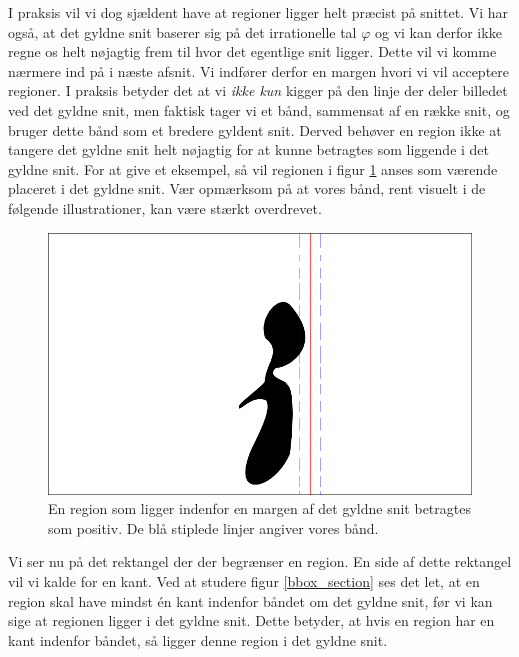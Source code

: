 {I praksis vil vi dog sjældent have at regioner ligger helt præcist på
snittet.
Vi har også, at det gyldne snit baserer sig på det
irrationelle tal $\varphi$ og vi kan derfor ikke regne os helt nøjagtig
frem til hvor det egentlige snit ligger. Dette vil vi komme nærmere ind
på i næste afsnit. Vi indfører derfor en margen hvori vi vil acceptere
regioner.  I praksis betyder det at vi \emph{ikke kun} kigger på den
linje der deler billedet ved det gyldne snit, men faktisk tager vi et
bånd, sammensat af en række snit, og bruger dette bånd som et bredere
gyldent snit.  Derved behøver en region ikke at tangere det gyldne snit
helt nøjagtig for at kunne betragtes som liggende i det gyldne snit. For
at give et eksempel, så vil regionen i figur \ref{pos_naiv_margin_1}
anses som værende placeret i det gyldne snit.  Vær opmærksom på at vores
bånd, rent visuelt i de følgende illustrationer, kan være stærkt
overdrevet.
\begin{figure}[h]
    \begin{center}
        \includegraphics[scale=\imgscale,angle=0]{afsnit/vores_implementation/billeder/naiv_algoritme/naiv_positiv_blob_margin_1}
    \end{center}
    \caption[Positiv region i margen]{En region som
    ligger indenfor en margen af det gyldne snit betragtes som
    positiv. De blå stiplede linjer angiver vores bånd.}
    \label{pos_naiv_margin_1}
\end{figure}

Vi ser nu på det rektangel der der begrænser en region.  En side af
dette rektangel vil vi kalde for en kant. Ved at studere figur
\ref{bbox_section} ses det let, at en region skal have mindst én kant
indenfor båndet om det gyldne snit, før vi kan sige at regionen ligger i
det gyldne snit. Dette betyder, at hvis en region har en kant indenfor
båndet, så ligger denne region i det gyldne snit.

}
